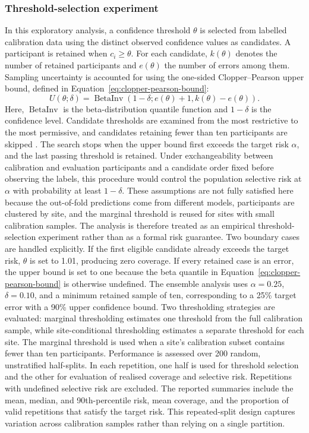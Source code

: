 \documentclass[11pt,a4paper]{article}
\begin{document}
\subsubsection*{Threshold-selection experiment}
In this exploratory analysis, a confidence threshold $\theta$ is selected from labelled calibration data using the distinct observed confidence values as candidates. A participant is retained when $c_i\geq\theta$. For each candidate, $k(\theta)$ denotes the number of retained participants and $e(\theta)$ the number of errors among them. Sampling uncertainty is accounted for using the one-sided Clopper--Pearson upper bound, defined in Equation~\eqref{eq:clopper-pearson-bound}:
\begin{equation}
U(\theta;\delta)
=
\operatorname{BetaInv}
\left(
1-\delta;
e(\theta)+1,
k(\theta)-e(\theta)
\right).
\label{eq:clopper-pearson-bound}
\end{equation}
Here, $\operatorname{BetaInv}$ is the beta-distribution quantile function and $1-\delta$ is the confidence level. Candidate thresholds are examined from the most restrictive to the most permissive, and candidates retaining fewer than ten participants are skipped \citep{Angelopoulosetal2021,AngelopoulosBates2023}. The search stops when the upper bound first exceeds the target risk $\alpha$, and the last passing threshold is retained. Under exchangeability between calibration and evaluation participants and a candidate order fixed before observing the labels, this procedure would control the population selective risk at $\alpha$ with probability at least $1-\delta$. These assumptions are not fully satisfied here because the out-of-fold predictions come from different models, participants are clustered by site, and the marginal threshold is reused for sites with small calibration samples. The analysis is therefore treated as an empirical threshold-selection experiment rather than as a formal risk guarantee. Two boundary cases are handled explicitly. If the first eligible candidate already exceeds the target risk, $\theta$ is set to 1.01, producing zero coverage. If every retained case is an error, the upper bound is set to one because the beta quantile in Equation~\eqref{eq:clopper-pearson-bound} is otherwise undefined. The ensemble analysis uses $\alpha=0.25$, $\delta=0.10$, and a minimum retained sample of ten, corresponding to a 25\% target error with a 90\% upper confidence bound. Two thresholding strategies are evaluated: marginal thresholding estimates one threshold from the full calibration sample, while site-conditional thresholding estimates a separate threshold for each site. The marginal threshold is used when a site's calibration subset contains fewer than ten participants. Performance is assessed over 200 random, unstratified half-splits. In each repetition, one half is used for threshold selection and the other for evaluation of realised coverage and selective risk. Repetitions with undefined selective risk are excluded. The reported summaries include the mean, median, and 90th-percentile risk, mean coverage, and the proportion of valid repetitions that satisfy the target risk. This repeated-split design captures variation across calibration samples rather than relying on a single partition.
\end{document}
